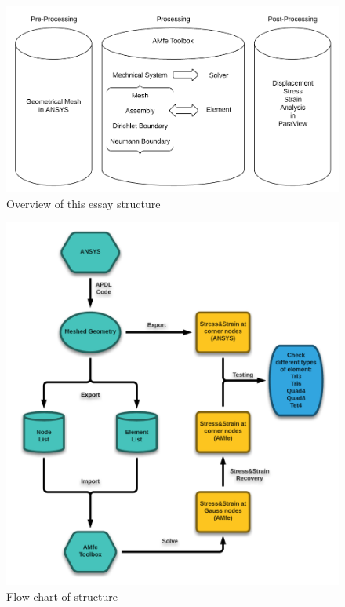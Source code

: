 \begin{figure}
	\begin{center}
		\includegraphics[width=12cm,clip]{Overview2.pdf}			
		\caption{Overview of this essay structure} \label{fig: Overview2}
	\end{center}
\end{figure}

\begin{figure}
	\begin{center}
		\includegraphics[width=12cm,clip]{Overview.pdf}			
		\caption{Flow chart of structure} \label{fig: Overview}
	\end{center}
\end{figure}



